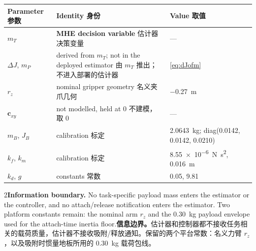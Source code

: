 \documentclass[10pt,a4paper]{article}
\numberwithin{equation}{section}
\newcommand{\dJ}{\Delta J}
\newcommand{\mB}{m_B}
\newcommand{\mP}{m_P}
\newcommand{\mT}{m_T}
\newcommand{\Jb}{J_B}
\newcommand{\pair}[2]{\begin{paracol}{2}#1\switchcolumn #2\end{paracol}}
\begin{document}
\begin{center}\small
\begin{tabularx}{\textwidth}{@{}l X l@{}}
\toprule
Parameter 参数 & Identity 身份 & Value 取值\\
\midrule
$\mT$ & \textbf{MHE decision variable} 估计器决策变量 & --- \\
$\dJ$, $\mP$ & derived from $\mT$; not in the deployed estimator 由 $\mT$ 推出；不进入部署的估计器 & \eqref{eq:dJofm} \\
$r_z$ & nominal gripper geometry 名义夹爪几何 & \SI{-0.27}{\meter} \\
$\bm c_{xy}$ & not modelled, held at 0 不建模，取 0 & --- \\
$\mB$, $\Jb$ & calibration 标定 & \SI{2.0643}{\kg}; diag(0.0142, 0.0142, 0.0210) \\
$k_f$, $k_m$ & calibration 标定 & \SI{8.55e-6}{\newton\second\squared}, \SI{0.016}{\meter} \\
$k_d$, $g$ & constants 常数 & 0.05, 9.81 \\
\bottomrule
\end{tabularx}
\end{center}
\pair{\textbf{Information boundary.} No task-specific payload mass enters the
estimator or the controller, and no attach/release notification enters the
estimator. Two platform constants remain: the nominal arm $r_z$ and the
\SI{0.30}{\kg} payload envelope used for the attach-time inertia floor.}
{\textbf{信息边界。}估计器和控制器都不接收任务相关的载荷质量，估计器不接收吸附/释放通知。保留的两个平台常数：名义力臂 $r_z$，以及吸附时惯量地板所用的 \SI{0.30}{\kg} 载荷包线。}
\end{document}
